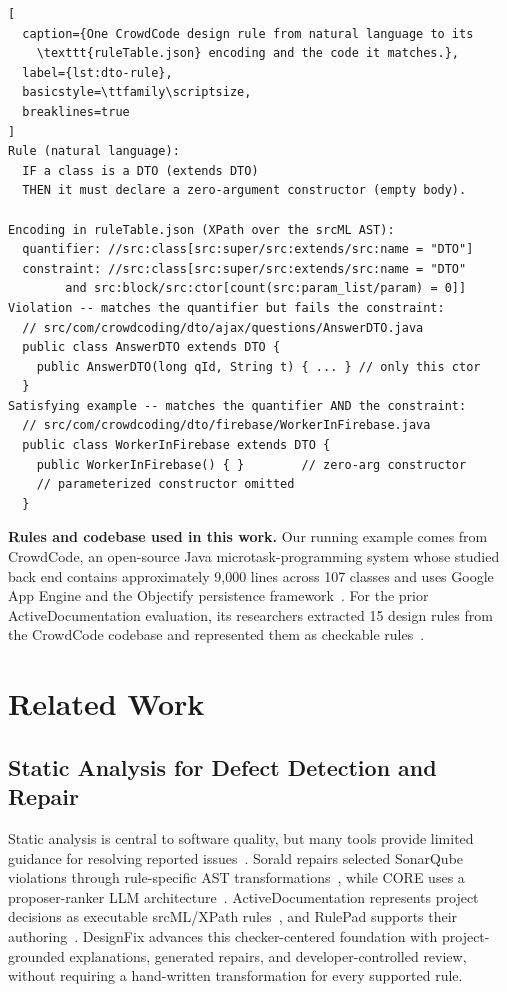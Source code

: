 \begin{lstlisting}[
  caption={One CrowdCode design rule from natural language to its
    \texttt{ruleTable.json} encoding and the code it matches.},
  label={lst:dto-rule},
  basicstyle=\ttfamily\scriptsize,
  breaklines=true
]
Rule (natural language):
  IF a class is a DTO (extends DTO)
  THEN it must declare a zero-argument constructor (empty body).

Encoding in ruleTable.json (XPath over the srcML AST):
  quantifier: //src:class[src:super/src:extends/src:name = "DTO"]
  constraint: //src:class[src:super/src:extends/src:name = "DTO"
        and src:block/src:ctor[count(src:param_list/param) = 0]]
Violation -- matches the quantifier but fails the constraint:
  // src/com/crowdcoding/dto/ajax/questions/AnswerDTO.java
  public class AnswerDTO extends DTO {
    public AnswerDTO(long qId, String t) { ... } // only this ctor
  }
Satisfying example -- matches the quantifier AND the constraint:
  // src/com/crowdcoding/dto/firebase/WorkerInFirebase.java
  public class WorkerInFirebase extends DTO {
    public WorkerInFirebase() { }        // zero-arg constructor
    // parameterized constructor omitted
  }
\end{lstlisting}

\textbf{Rules and codebase used in this work.}
Our running example comes from CrowdCode, an open-source Java
microtask-programming system whose studied back end contains
approximately 9{,}000 lines across 107 classes and uses Google App
Engine and the Objectify persistence framework~\cite{crowdcode,
mehrpour2019active,latoza2014microtask,latoza2019microtaskTSE}.
For the prior ActiveDocumentation evaluation, its researchers
extracted 15 design rules from the CrowdCode codebase and represented
them as checkable rules~\cite{mehrpour2019active}.



\section{Related Work}
\label{sec:related-work}

\subsection{Static Analysis for Defect Detection and Repair}
\label{sec:related-static-analysis}
Static analysis is central to software quality, but many tools provide
limited guidance for resolving reported issues~\cite{nachtigall2022usability}. Sorald repairs selected SonarQube
violations through rule-specific AST transformations~\cite{etemadi2022sorald}, while CORE uses a proposer-ranker LLM
architecture~\cite{wadhwa2024core}. ActiveDocumentation represents
project decisions as executable srcML/XPath rules~\cite{mehrpour2019active}, and RulePad supports their authoring~\cite{mehrpour2020rulepad}. DesignFix advances this checker-centered
foundation with project-grounded explanations, generated repairs, and
developer-controlled review, without requiring a hand-written
transformation for every supported rule.

